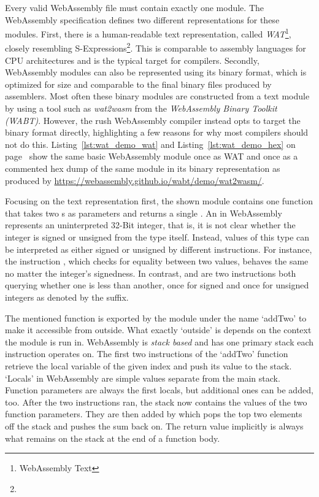 Every valid WebAssembly file must contain exactly one module.
The WebAssembly specification defines two different representations for these modules.
First, there is a human-readable text representation, called \emph{WAT}\footnote{WebAssembly Text}, closely resembling S-Expressions\footnote{}.
This is comparable to assembly languages for CPU architectures and is the typical target for compilers.
Secondly, WebAssembly modules can also be represented using its binary format, which is optimized for size and comparable to the final binary files produced by assemblers.
Most often these binary modules are constructed from a text module by using a tool such as \emph{wat2wasm} from the \emph{WebAssembly Binary Toolkit (WABT)}.
However, the rush WebAssembly compiler instead opts to target the binary format directly, highlighting a few reasons for why most compilers should not do this.
Listing~\ref{lst:wat_demo_wat} and Listing~\ref{lst:wat_demo_hex} on page~\pageref{lst:wat_demo_wat} show the same basic WebAssembly module once as WAT and once as a commented hex dump of the same module in its binary representation as produced by \url{https://webassembly.github.io/wabt/demo/wat2wasm/}.


Focusing on the text representation first, the shown module contains one function that takes two s as parameters and returns a single .
An  in WebAssembly represents an uninterpreted 32-Bit integer, that is, it is not clear whether the integer is signed or unsigned from the type itself.
Instead, values of this type can be interpreted as either signed or unsigned by different instructions.
For instance, the instruction , which checks for equality between two  values, behaves the same no matter the integer's signedness.
In contrast,  and  are two instructions both querying whether one  is less than another, once for signed and once for unsigned integers as denoted by the suffix.

The mentioned function is exported by the module under the name `addTwo' to make it accessible from outside.
What exactly `outside' is depends on the context the module is run in.
WebAssembly is \emph{stack based} and has one primary stack each instruction operates on.
The first two instructions of the `addTwo' function retrieve the local variable of the given index and push its value to the stack.
`Locals' in WebAssembly are simple values separate from the main stack.
Function parameters are always the first locals, but additional ones can be added, too.
After the two instructions ran, the stack now contains the values of the two function parameters.
They are then added by  which pops the top two elements off the stack and pushes the sum back on.
The return value implicitly is always what remains on the stack at the end of a function body.

